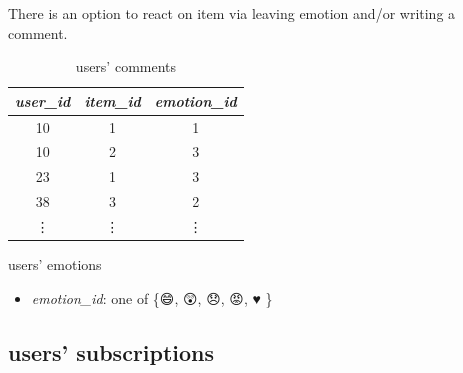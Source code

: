 \documentclass{article}
\begin{document}
    There is an option to react on item via leaving emotion and/or writing a comment.

    \begin{table}[h]
        \parbox{.45\textwidth}{
            \centering
            \begin{tabular}{ccc}
                \toprule

                \emph{user\_id} & \emph{item\_id} & \emph{emotion\_id} \\\midrule
                10 & 1 & 1  \\
                10 & 2 & 3        \\
                23 & 1 & 3        \\
                38 & 3 & 2        \\
                \vdots & \vdots & \vdots  \\\bottomrule

            \end{tabular}
            \caption{users' emotions}
            \label{tab:emotion}
        }
        \hfill
        \parbox{.45\textwidth}{
            \centering
            \caption{users' comments}
            \label{tab:comment}
            }
    \end{table}   
    
    \begin{itemize}
        \item \emph{emotion\_id}: one of \{{\DejaSans 😄, 😲, 😞, 😡, ♥ }\}
    \end{itemize}




    \subsection*{users' subscriptions}
\end{document}
